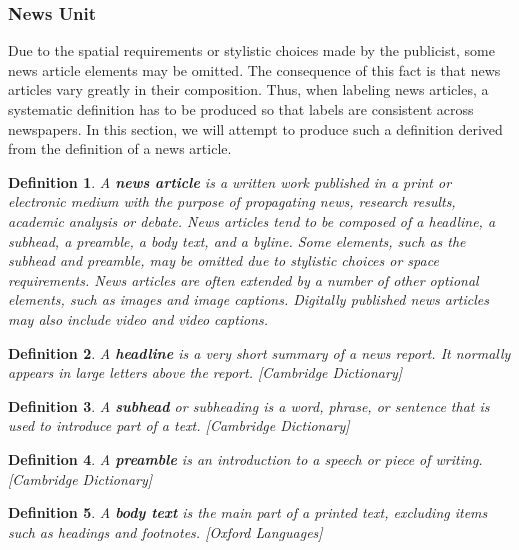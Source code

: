 \documentclass[english, bibtex]{kththesis}
\begin{document}
\subsubsection{News Unit}

Due to the spatial requirements or stylistic choices made by the publicist, some news article elements may be omitted. The consequence of this fact is that news articles vary greatly in their composition. Thus, when labeling news articles, a systematic definition has to be produced so that labels are consistent across newspapers. In this section, we will attempt to produce such a definition derived from the definition of a news article.

\newtheorem{lemma}{Lemma}[chapter]
\newcommand{\lemmaautorefname}{Lemma}
\newtheorem{definition}[lemma]{Definition}
\newcommand{\definitionautorefname}{Definition}

\begin{definition}
\label{newsarticle}
A \textbf{news article} is a written work published in a print or electronic medium with the purpose of propagating news, research results, academic analysis or debate. News articles tend to be composed of a headline, a subhead, a preamble, a body text, and a byline. Some elements, such as the subhead and preamble, may be omitted due to stylistic choices or space requirements. News articles are often extended by a number of other optional elements, such as images and image captions. Digitally published news articles may also include video and video captions.
\end{definition}

\begin{definition}
\label{headline}
A \textbf{headline} is a very short summary of a news report. It normally appears in large letters above the report. [Cambridge Dictionary]
\end{definition}

\begin{definition}
\label{subhead}
A \textbf{subhead} or subheading is a word, phrase, or sentence that is used to introduce part of a text. [Cambridge Dictionary]
\end{definition}

\begin{definition}
\label{preamble}
A \textbf{preamble} is an introduction to a speech or piece of writing. [Cambridge Dictionary]
\end{definition}

\begin{definition}
\label{body text}
A \textbf{body text} is the main part of a printed text, excluding items such as headings and footnotes. [Oxford Languages]
\end{definition}
\end{document}
